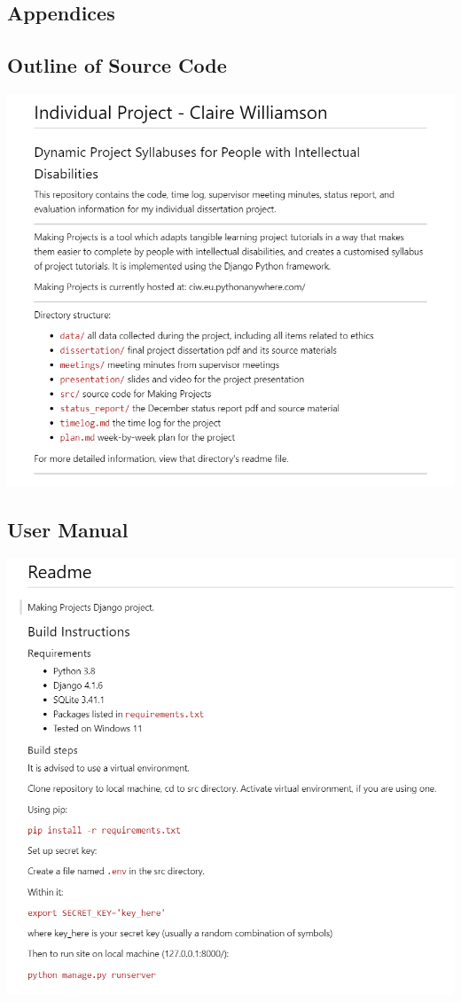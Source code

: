 \documentclass{l4proj}
\newcommand{\pdfsection}[2]{
}
\newcommand{\pdfpage}[2]{}
\begin{document}
\begin{appendices}

\chapter{Appendices}


\pdfsection{Ethics Approval}{images/ethics_checklist.pdf}
\label{ethics-approval}

\pdfpage{Evaluation Consent Form}{images/consent_form.pdf}
\label{consent-form}

\pdfpage{Evaluation Introduction Script}{images/evaluation_intro.pdf}
\label{eval-intro}

\pdfpage{Information on Making Projects for User Evaluation}{images/evaluation_info.pdf}
\label{eval-info}

\pdfpage{Evaluation Debriefing Script}{images/debriefing_info.pdf}
\label{eval-debrief}

\section{Outline of Source Code}
\includegraphics[width=0.75\linewidth]{images/readme1.png}  
\section{User Manual}
\includegraphics[width=0.75\linewidth]{images/readme.png}  


\end{appendices}
\end{document}
